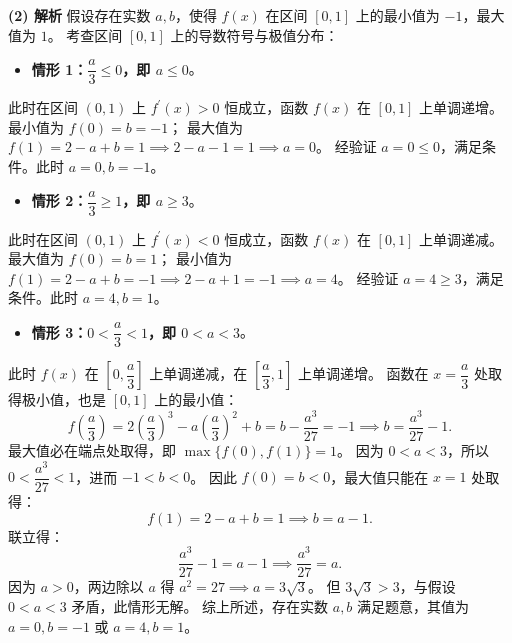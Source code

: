 \begin{answer}
\textbf{(2) 解析}
假设存在实数 $a, b$，使得 $f(x)$ 在区间 $[0, 1]$ 上的最小值为 $-1$，最大值为 $1$。
考查区间 $[0, 1]$ 上的导数符号与极值分布：
\begin{itemize}
\item \textbf{情形 1：$\dfrac{a}{3} \leqslant 0$，即 $a \leqslant 0$}。
\end{itemize}
  此时在区间 $(0, 1)$ 上 $f^\prime(x) > 0$ 恒成立，函数 $f(x)$ 在 $[0, 1]$ 上单调递增。
  最小值为 $f(0) = b = -1$；
  最大值为 $f(1) = 2 - a + b = 1 \implies 2 - a - 1 = 1 \implies a = 0$。
  经验证 $a = 0 \leqslant 0$，满足条件。此时 $a = 0, b = -1$。
\begin{itemize}
\item \textbf{情形 2：$\dfrac{a}{3} \geqslant 1$，即 $a \geqslant 3$}。
\end{itemize}
  此时在区间 $(0, 1)$ 上 $f^\prime(x) < 0$ 恒成立，函数 $f(x)$ 在 $[0, 1]$ 上单调递减。
  最大值为 $f(0) = b = 1$；
  最小值为 $f(1) = 2 - a + b = -1 \implies 2 - a + 1 = -1 \implies a = 4$。
  经验证 $a = 4 \geqslant 3$，满足条件。此时 $a = 4, b = 1$。
\begin{itemize}
\item \textbf{情形 3：$0 < \dfrac{a}{3} < 1$，即 $0 < a < 3$}。
\end{itemize}
  此时 $f(x)$ 在 $\left[0, \dfrac{a}{3}\right]$ 上单调递减，在 $\left[\dfrac{a}{3}, 1\right]$ 上单调递增。
  函数在 $x = \dfrac{a}{3}$ 处取得极小值，也是 $[0, 1]$ 上的最小值：
\nopagebreak[4]
\[f\left(\frac{a}{3}\right) = 2\left(\frac{a}{3}\right)^3 - a\left(\frac{a}{3}\right)^2 + b = b - \frac{a^3}{27} = -1 \implies b = \frac{a^3}{27} - 1.\]
  最大值必在端点处取得，即 $\max\{f(0), f(1)\} = 1$。
  因为 $0 < a < 3$，所以 $0 < \dfrac{a^3}{27} < 1$，进而 $-1 < b < 0$。
  因此 $f(0) = b < 0$，最大值只能在 $x = 1$ 处取得：
\nopagebreak[4]
\[f(1) = 2 - a + b = 1 \implies b = a - 1.\]
  联立得：
\nopagebreak[4]
\[\frac{a^3}{27} - 1 = a - 1 \implies \frac{a^3}{27} = a.\]
  因为 $a > 0$，两边除以 $a$ 得 $a^2 = 27 \implies a = 3\sqrt{3}$。
  但 $3\sqrt{3} > 3$，与假设 $0 < a < 3$ 矛盾，此情形无解。
综上所述，存在实数 $a, b$ 满足题意，其值为 $a = 0, b = -1$ 或 $a = 4, b = 1$。



\end{answer}
